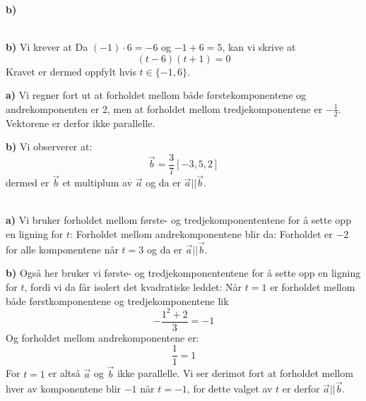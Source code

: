 
\textbf{b)} 


\\
\textbf{b)} Vi krever at
Da $ (-1)\cdot6 = -6 $ og $ -1+6=5 $, kan vi skrive at
\[ (t-6)(t+1)=0 \]
Kravet er dermed oppfylt hvis $ t\in\lbrace-1, 6\rbrace $. 

\textbf{a)} Vi regner fort ut at forholdet mellom både førstekomponentene og andrekomponenten er 2, men at forholdet mellom tredjekomponentene er $ -\frac{1}{2} $. Vektorene er derfor ikke parallelle.

\textbf{b)} Vi observerer at:
\[ \vec{b}=\frac{3}{7}[-3, 5, 2] \]
dermed er $ \vec{b} $ et multiplum av $ \vec{a} $ og da er $ \vec{a}||\vec{b} $.

\\
\textbf{a)} Vi bruker forholdet mellom første- og tredjekomponententene for å sette opp en ligning for $ t $:
Forholdet mellom andrekomponentene blir da:
Forholdet er $ -2 $ for alle komponentene når $ t=3 $ og da er $ \vec{a}||\vec{b} $.

\textbf{b)} Også her bruker vi første- og tredjekomponententene for å sette opp en ligning for $ t $, fordi vi da får isolert det kvadratiske leddet:
Når $ t=1 $ er forholdet mellom både førstkomponentene og tredjekomponentene lik
\[ -\frac{1^2+2}{3}=-1 \]
Og forholdet mellom andrekomponentene er:
\[ \frac{1}{1}=1 \]
For $ t=1 $ er altså $ \vec{a} $ og $ \vec{b} $ ikke parallelle. Vi ser derimot fort at forholdet mellom hver av komponentene blir $ -1 $ når $ t=-1 $, for dette valget av $ t $ er derfor $ \vec{a}||\vec{b} $.

